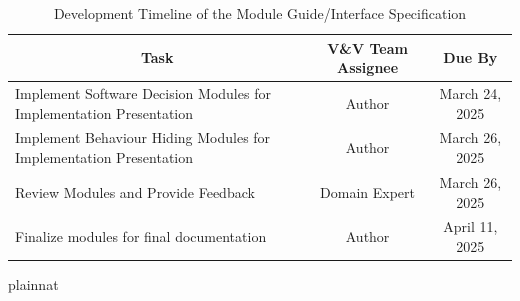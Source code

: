 \documentclass[12pt, titlepage]{article}
\begin{document}
\begin{table}[H]
  \centering
  \renewcommand{\arraystretch}{1.3} %
  \begin{tabular}{|p{7cm}|c|c|}
  \hline
  \multicolumn{1}{|c|}{\textbf{Task}} & \textbf{V\&V Team Assignee} & \textbf{Due By} \\ \hline
  \raggedright Implement Software Decision Modules for Implementation Presentation & Author & March 24, 2025 \\ \hline
  \raggedright Implement Behaviour Hiding Modules for Implementation Presentation & Author & March 26, 2025 \\ \hline
  \raggedright Review Modules and Provide Feedback & Domain Expert & March 26, 2025 \\ \hline
  \raggedright Finalize modules for final documentation & Author & April 11, 2025 \\ \hline
  \end{tabular}
  \caption{Development Timeline of the Module Guide/Interface Specification}
  \label{MG_Timeline}
\end{table}
  
 {plainnat}


\newpage{}
\end{document}
